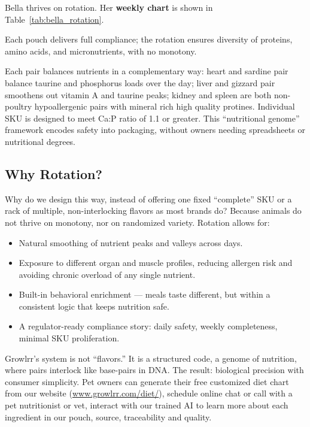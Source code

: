 Bella thrives on rotation. Her \textbf{weekly chart} is shown in Table~\ref{tab:bella_rotation}.

Each pouch delivers full compliance; the rotation ensures diversity of proteins, amino acids, and micronutrients, with no monotony.

Each pair balances nutrients in a complementary way: heart and sardine pair balance taurine and phosphorus loads over the day; liver and gizzard pair smoothens out vitamin A  and taurine peaks;  kidney and spleen are both non-poultry hypoallergenic pairs with mineral rich high quality protines. Individual SKU is designed to meet Ca:P ratio of 1.1 or greater. This ``nutritional genome'' framework encodes safety into packaging, without owners needing spreadsheets or nutritional degrees.

\subsection*{Why Rotation?}

Why do we design this way, instead of offering one fixed ``complete'' SKU or a rack of multiple, non-interlocking flavors as most brands do? Because animals do not thrive on monotony, nor on randomized variety. Rotation allows for\cite{ref3,ref12,web6,web75}:

\begin{itemize}[leftmargin=1.5em]
  \item Natural smoothing of nutrient peaks and valleys across days.
  \item Exposure to different organ and muscle profiles, reducing allergen risk\cite{web27,web32,web76,web77,web83} and avoiding chronic overload of any single nutrient.
  \item Built-in behavioral enrichment --- meals taste different, but within a consistent logic that keeps nutrition safe.
  \item A regulator-ready compliance story: daily safety, weekly completeness, minimal SKU proliferation.
\end{itemize}

Growlrr's system is not ``flavors.'' It is a structured code, a genome of nutrition, where pairs interlock like base-pairs in DNA. The result: biological precision with consumer simplicity. Pet owners can generate their free customized diet chart\cite{ref10} from our website (\url{www.growlrr.com/diet/}), schedule online chat or call with a pet nutritionist or vet, interact with our trained AI to learn more about each ingredient in our pouch, source, traceability and quality.
